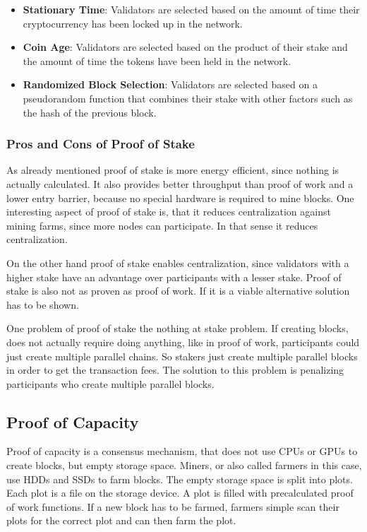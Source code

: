 \begin{itemize}
    \item\textbf{Stationary Time}: Validators are selected based on the amount of time their cryptocurrency has been locked up in the network.\cite{bitpanda-pos}
    \item\textbf{Coin Age}: Validators are selected based on the product of their stake and the amount of time the tokens have been held in the network.\cite{bitflyer-glossary}
    \item\textbf{Randomized Block Selection}: Validators are selected based on a pseudorandom function that combines their stake with other factors such as the hash of the previous block.\cite{cryptonews-pos}
\end{itemize}

\subsubsection{Pros and Cons of Proof of Stake}
As already mentioned proof of stake is more energy efficient, since nothing is actually calculated.
It also provides better throughput than proof of work and a lower entry barrier, because no special hardware is required to mine blocks.
One interesting aspect of proof of stake is, that it reduces centralization against mining farms, since more nodes can participate.
In that sense it reduces centralization.\cite{bitpanda-pos}

On the other hand proof of stake enables centralization, since validators with a higher stake have an advantage over participants with a lesser stake.
Proof of stake is also not as proven as proof of work.
If it is a viable alternative solution has to be shown.\cite{insider-pos-vs-pow}

One problem of proof of stake the nothing at stake problem.
If creating blocks, does not actually require doing anything, like in proof of work, participants could just create multiple parallel chains.
So stakers just create multiple parallel blocks in order to get the transaction fees.
The solution to this problem is penalizing participants who create multiple parallel blocks.


\subsection{Proof of Capacity}\label{subsec:proof-of-capacity}
Proof of capacity is a consensus mechanism, that does not use CPUs or GPUs to create blocks, but empty storage space.
Miners, or also called farmers in this case, use HDDs and SSDs to farm blocks.
The empty storage space is split into plots.
Each plot is a file on the storage device.
A plot is filled with precalculated proof of work functions.
If a new block has to be farmed, farmers simple scan their plots for the correct plot and can then farm the plot.

